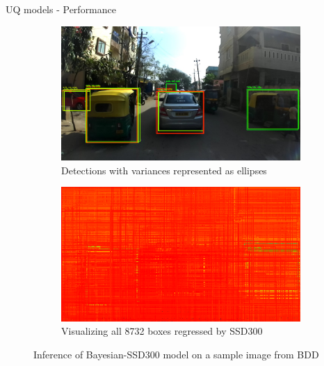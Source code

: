 \documentclass[10pt, aspectratio=169]{beamer}
\begin{document}
\begin{frame}[allowframebreaks]{UQ models - Performance}
       \begin{figure}[H]
        \captionsetup[table]{skip=0pt}
           \centering
           \begin{subfigure}[t]{0.495\textwidth}
               \centering
               \includegraphics[width=\textwidth]{images/det_images/idd_bnn_variances_1.png}
               \caption{Detections with variances represented as ellipses}
           \end{subfigure}
           \begin{subfigure}[t]{0.495\textwidth}
               \centering
               \includegraphics[width=\textwidth]{images/det_images/all_bnn_idd_1.png}
               \caption{Visualizing all 8732 boxes regressed by SSD300}
           \end{subfigure}
           \caption{Inference of Bayesian-SSD300 model on a sample image from BDD}
       \end{figure}


\end{frame}
\end{document}
